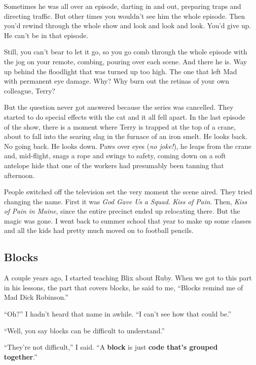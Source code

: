 \documentclass[10pt,twoside]{report}
\begin{document}
Sometimes he was all over an episode, darting in and out, preparing
traps and directing traffic. But other times you wouldn't see him the
whole episode.  Then you'd rewind through the whole show and look and
look and look.  You'd give up.  He can't be in that episode.

Still, you can't bear to let it go, so you go comb through the whole
episode with the jog on your remote, combing, pouring over each scene.
And there he is.  Way up behind the floodlight that was turned up too
high.  The one that left Mad with permanent eye damage.  Why?  Why
burn out the retinas of your own colleague, Terry?

But the question never got answered because the series was cancelled.
They started to do special effects with the cat and it all fell apart.
In the last episode of the show, there is a moment where Terry is
trapped at the top of a crane, about to fall into the searing slag in
the furnace of an iron smelt.  He looks back.  No going back.  He
looks down.  Paws over eyes ({\em no joke!}), he leaps from the crane
and, mid-flight, snags a rope and swings to safety, coming down on a
soft antelope hide that one of the workers had presumably been tanning
that afternoon.

People switched off the television set the very moment the scene
aired.  They tried changing the name. First it was {\em God Gave Us a
  Squad}.  {\em Kiss of Pain}.  Then, {\em Kiss of Pain in Maine},
since the entire precinct ended up relocating there.  But the magic
was gone.  I went back to summer school that year to make up some
classes and all the kids had pretty much moved on to football pencils.



\subsection{Blocks}



A couple years ago, I started teaching Blix about Ruby.  When we got
to this part in his lessons, the part that covers blocks, he said to
me, ``Blocks remind me of Mad Dick Robinson.''

``Oh?''  I hadn't heard that name in awhile.  ``I can't see how that
could be.''

``Well, you say blocks can be difficult to understand.''

``They're not difficult,'' I said.  ``A {\bf block} is just {\bf code
  that's grouped together}.''
\end{document}
